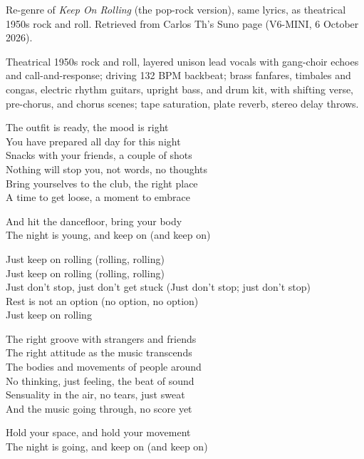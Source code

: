 
\begin{notes}
Re-genre of \emph{Keep On Rolling} (the pop-rock version), same lyrics, as theatrical 1950s rock and roll. Retrieved from Carlos Th's Suno page (V6-MINI, 6 October 2026).
\end{notes}
\begin{style}
Theatrical 1950s rock and roll, layered unison lead vocals with gang-choir echoes and call-and-response; driving 132 BPM backbeat; brass fanfares, timbales and congas, electric rhythm guitars, upright bass, and drum kit, with shifting verse, pre-chorus, and chorus scenes; tape saturation, plate reverb, stereo delay throws.
\end{style}
\begin{lyrics}
The outfit is ready, the mood is right\\
You have prepared all day for this night\\
Snacks with your friends, a couple of shots\\
Nothing will stop you, not words, no thoughts\\
Bring yourselves to the club, the right place\\
A time to get loose, a moment to embrace

And hit the dancefloor, bring your body\\
The night is young, and keep on (and keep on)

Just keep on rolling (rolling, rolling)\\
Just keep on rolling (rolling, rolling)\\
Just don't stop, just don't get stuck
(Just don't stop; just don't stop)\\
Rest is not an option (no option, no option)\\
Just keep on rolling

The right groove with strangers and friends\\
The right attitude as the music transcends\\
The bodies and movements of people around\\
No thinking, just feeling, the beat of sound\\
Sensuality in the air, no tears, just sweat\\
And the music going through, no score yet

Hold your space, and hold your movement\\
The night is going, and keep on (and keep on)


\end{lyrics}
